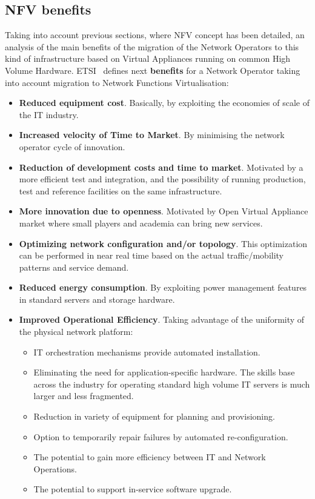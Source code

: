\documentclass[a4paper, 12pt]{book}
\begin{document}
\subsection{NFV benefits}

Taking into account previous sections, where NFV concept has been detailed, an analysis of the main benefits of the migration of the Network Operators to this kind of infrastructure based on Virtual Appliances running on common High Volume Hardware. ETSI~\cite{ETSINFVDefinition} defines next \textbf{benefits} for a Network Operator taking into account migration to Network Functions Virtualisation:

\begin{itemize}\itemsep0pt
 \item{\textbf{Reduced equipment cost}}. Basically, by exploiting the economies of scale of the IT industry.
 \item{\textbf{Increased velocity of Time to Market}}. By minimising the network operator cycle of innovation.
 \item{\textbf{Reduction of development costs and time to market}}. Motivated by a more efficient test and integration, and the possibility of running production, test and reference facilities on the same infrastructure.
 \item{\textbf{More innovation due to openness}}. Motivated by Open Virtual Appliance market where small players and academia can bring new services.
 \item{\textbf{Optimizing network configuration and/or topology}}. This optimization can be performed in near real time based on the actual traffic/mobility patterns and service demand.
 \item{\textbf{Reduced energy consumption}}. By exploiting power management features in standard servers and storage hardware.
 \item{\textbf{Improved Operational Efficiency}}. Taking advantage of the uniformity of the physical network platform:
 \begin{itemize}\itemsep0pt
    \item{IT orchestration mechanisms provide automated installation}.
    \item{Eliminating the need for application-specific hardware}. The skills base across the industry for operating standard high volume IT servers is much larger and less fragmented.
    \item{Reduction in variety of equipment for planning and provisioning}.
    \item{Option to temporarily repair failures by automated re-configuration}.
    \item{The potential to gain more efficiency between IT and Network Operations}.
    \item{The potential to support in-service software upgrade}.
 \end{itemize}
\end{itemize}
\end{document}
